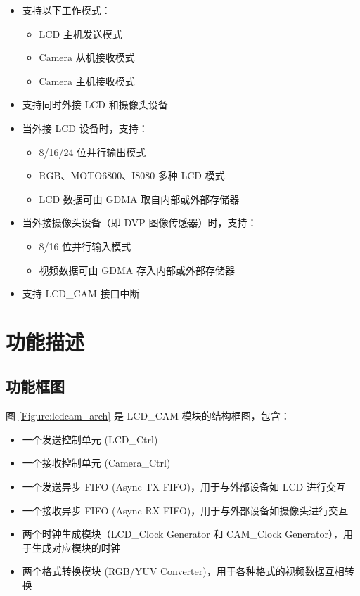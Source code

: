 \documentclass[main\_\_CN.tex]{subfiles}
\begin{document}
\begin{itemize}
    \item 支持以下工作模式：
        \begin{itemize}
        \item LCD 主机发送模式
        \item Camera 从机接收模式
        \item Camera 主机接收模式
        \end{itemize}
    \item 支持同时外接 LCD 和摄像头设备
    \item 当外接 LCD 设备时，支持：
        \begin{itemize}
        \item 8/16/24 位并行输出模式
        \item RGB、MOTO6800、I8080 多种 LCD 模式
        \item LCD 数据可由 GDMA 取自内部或外部存储器
        \end{itemize}
    \item 当外接摄像头设备（即 DVP 图像传感器）时，支持：
        \begin{itemize}
        \item 8/16 位并行输入模式
        \item 视频数据可由 GDMA 存入内部或外部存储器
        \end{itemize}
    \item 支持 LCD\_CAM 接口中断
\end{itemize}

\section{功能描述}

\subsection{功能框图}
图 \ref{Figure:lcdcam_arch} 是 \chipname{} LCD\_CAM 模块的结构框图，包含：
\begin{itemize}
    \item 一个发送控制单元 (LCD\_Ctrl)
    \item 一个接收控制单元 (Camera\_Ctrl)
    \item 一个发送异步 FIFO (Async TX FIFO)，用于与外部设备如 LCD 进行交互
    \item 一个接收异步 FIFO (Async RX FIFO)，用于与外部设备如摄像头进行交互
    \item 两个时钟生成模块（LCD\_Clock Generator 和 CAM\_Clock Generator），用于生成对应模块的时钟
    \item 两个格式转换模块 (RGB/YUV Converter)，用于各种格式的视频数据互相转换
\end{itemize}
\end{document}
